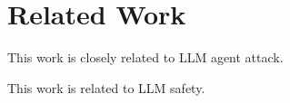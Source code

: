 \section{Related Work}

This work is closely related to LLM agent attack.

This work is related to LLM safety.



